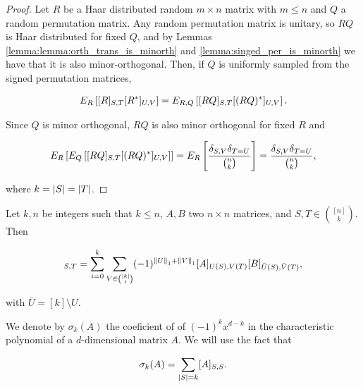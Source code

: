\begin{proof}
    Let $R$ be a Haar distributed random $m\times n$ matrix with $m \le n$ and $Q$ a random permutation matrix. Any random permutation matrix is unitary, so $RQ$ is Haar distributed for fixed $Q$, and by Lemmas \ref{lemma:lemma:orth_trans_is_minorth} and \ref{lemma:singed_per_is_minorth} we have that it is also minor-orthogonal. Then, if $Q$ is uniformly sampled from the signed permutation matrices,

    \begin{align*}
        E_R\left[ [R]_{S,T}[R^*]_{U,V} \right] = E_{R,Q}\left[ [RQ]_{S,T} [(RQ)^*]_{U,V}\right]. 
    \end{align*}

    Since $Q$ is minor orthogonal, $RQ$ is also minor orthogonal for fixed $R$ and 

    \begin{align*}
        E_R\left[ E_Q \left[ [RQ]_{S,T}[(RQ)^*]_{U,V} \right] \right] = E_R\left[ \frac{\delta_{S,V}\delta_{T=U}}{\binom{n}{k}}\right] = \frac{\delta_{S,V}\delta_{T=U}}{\binom{n}{k}},
    \end{align*}

    \noindent where $k = \lvert S \rvert = \lvert T \rvert$. 
\end{proof}



\begin{theorem} \label{thm:marcus_binet}
    Let $k,n$ be integers such that $k\le n$, $A,B$ two $n\times n$ matrices, and $S,T \in \binom{[n]}{k}$. Then
    
    \begin{equation*}
        [A+B]_{S,T} = \sum_{i=0}^k \sum_{V \in \binom{[k]}{i}} (-1)^{\norm{U}_1 + \norm{V}_1} [A]_{U(S),V(T)}[B]_{\bar{U}(S),\bar{V}(T)},
    \end{equation*}

    \noindent with $\bar U = [k] \setminus U$.
\end{theorem}


We denote by $\sigma_k(A)$ the coeficient of of $(-1)^{k}x^{d-k}$ in the characteristic polynomial of a $d$-dimensional matrix $A$. We will use the fact that 

\begin{equation*}
    \sigma_k(A) = \sum_{\lvert S \rvert = k} [A]_{S,S}.
\end{equation*}

